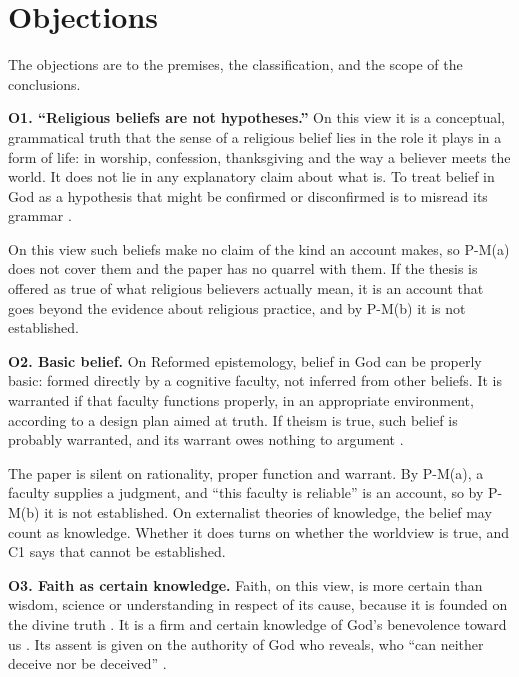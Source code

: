 \section{Objections}\label{sec:objections}

The objections are to the premises, the classification, and the scope of the conclusions.

\medskip\noindent\textbf{O1. ``Religious beliefs are not hypotheses.''}\label{item:O1}
On this view it is a conceptual, grammatical truth that the sense of a religious belief lies in
the role it plays in a form of life: in worship, confession, thanksgiving and the way a believer
meets the world. It does not lie in any
explanatory claim about what is. To treat belief in God as a hypothesis that might be confirmed
or disconfirmed is to misread its grammar \citep{phillips1976}.

On this view such beliefs make no claim of the kind an account makes, so P-M(a) does not cover
them and the paper has no quarrel with them. If the thesis is offered as true of what religious
believers actually mean, it is an account that goes beyond the evidence about religious practice,
and by P-M(b) it is not established.

\medskip\noindent\textbf{O2. Basic belief.}\label{item:O2}
On Reformed epistemology, belief in God can be properly basic: formed directly by a cognitive
faculty, not inferred from other beliefs. It is warranted if that faculty functions properly, in
an appropriate environment, according to a design plan aimed at truth. If theism is true, such
belief is probably warranted, and its warrant owes nothing to argument \citep{plantinga2000}.

The paper is silent on rationality, proper function and warrant. By P-M(a), a faculty supplies a
judgment, and ``this faculty is reliable'' is an account, so by P-M(b) it is not established. On externalist theories of knowledge, the belief
may count as knowledge. Whether it does turns on whether the worldview is true, and C1 says that
cannot be established.

\medskip\noindent\textbf{O3. Faith as certain knowledge.}\label{item:O3}
Faith, on this view, is more certain than wisdom, science or understanding in respect of its
cause, because it is founded on the divine truth \citep[II-II q.4 a.8]{aquinas-st}. It is a firm and
certain knowledge of God's benevolence toward us \citep[III.2.7]{calvin1559}. Its assent is given
on the authority of God who reveals, who ``can neither deceive nor be deceived''
\citep[ch.~3]{vatican1870}.

